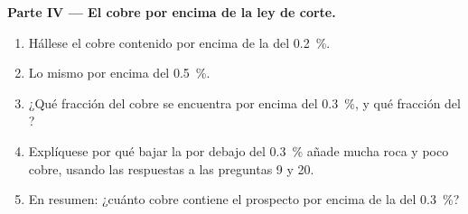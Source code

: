 \begin{problem}
\noindent\textbf{Parte IV --- El cobre por encima de la ley de corte.}
\begin{enumerate}[resume]
  \item Hállese el cobre contenido por encima de la  del \qty{0.2}{\percent}.
  \item Lo mismo por encima del \qty{0.5}{\percent}.
  \item ¿Qué fracción del cobre se encuentra por encima del \qty{0.3}{\percent}, y qué fracción del
        ?
  \item Explíquese por qué bajar la  por debajo del \qty{0.3}{\percent} añade mucha roca y poco
        cobre, usando las respuestas a las preguntas 9 y 20.
  \item En resumen: ¿cuánto cobre contiene el prospecto por encima de la  del \qty{0.3}{\percent}?
\end{enumerate}
\end{problem}
